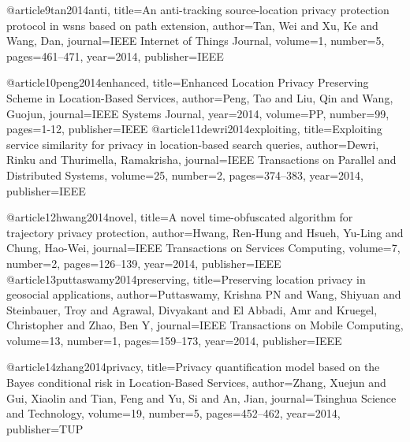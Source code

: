 {{{{{{{{@article{9tan2014anti,
  title={An anti-tracking source-location privacy protection protocol in wsns based on path extension},
  author={Tan, Wei and Xu, Ke and Wang, Dan},
  journal={IEEE Internet of Things Journal},
  volume={1},
  number={5},
  pages={461--471},
  year={2014},
  publisher={IEEE}
}

@article{10peng2014enhanced,
  title={Enhanced Location Privacy Preserving Scheme in Location-Based Services},
  author={Peng, Tao and Liu, Qin and Wang, Guojun},
  journal={IEEE Systems Journal},
  year={2014},
  volume={PP},
  number={99},
  pages={1-12},
  publisher={IEEE}
}
@article{11dewri2014exploiting,
  title={Exploiting service similarity for privacy in location-based search queries},
  author={Dewri, Rinku and Thurimella, Ramakrisha},
  journal={IEEE Transactions on Parallel and Distributed Systems},
  volume={25},
  number={2},
  pages={374--383},
  year={2014},
  publisher={IEEE}
}

@article{12hwang2014novel,
  title={A novel time-obfuscated algorithm for trajectory privacy protection},
  author={Hwang, Ren-Hung and Hsueh, Yu-Ling and Chung, Hao-Wei},
  journal={IEEE Transactions on Services Computing},
  volume={7},
  number={2},
  pages={126--139},
  year={2014},
  publisher={IEEE}
}
@article{13puttaswamy2014preserving,
  title={Preserving location privacy in geosocial applications},
  author={Puttaswamy, Krishna PN and Wang, Shiyuan and Steinbauer, Troy and Agrawal, Divyakant and El Abbadi, Amr and Kruegel, Christopher and Zhao, Ben Y},
  journal={IEEE Transactions on Mobile Computing},
  volume={13},
  number={1},
  pages={159--173},
  year={2014},
  publisher={IEEE}
}

@article{14zhang2014privacy,
  title={Privacy quantification model based on the Bayes conditional risk in Location-Based Services},
  author={Zhang, Xuejun and Gui, Xiaolin and Tian, Feng and Yu, Si and An, Jian},
  journal={Tsinghua Science and Technology},
  volume={19},
  number={5},
  pages={452--462},
  year={2014},
  publisher={TUP}
}

}}}}}}}}
